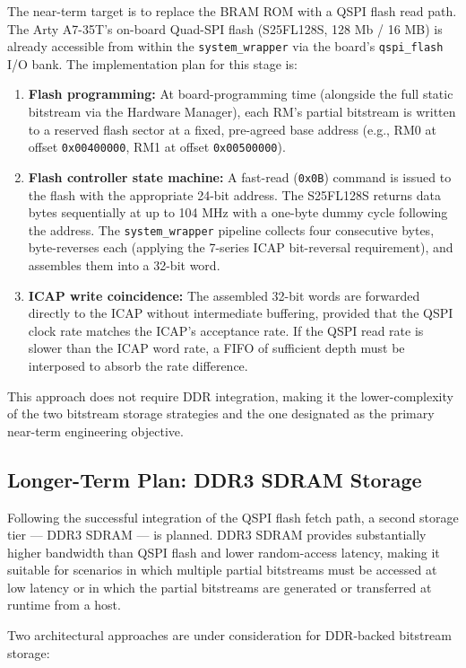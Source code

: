 The near-term target is to replace the BRAM ROM with a QSPI flash read path. The Arty A7-35T's on-board Quad-SPI flash (S25FL128S, 128 Mb / 16 MB) is already accessible from within the \texttt{system\_wrapper} via the board's \texttt{qspi\_flash} I/O bank. The implementation plan for this stage is:

\begin{enumerate}
  \item \textbf{Flash programming:} At board-programming time (alongside the full static bitstream via the Hardware Manager), each RM's partial bitstream is written to a reserved flash sector at a fixed, pre-agreed base address (e.g., RM0 at offset \texttt{0x00400000}, RM1 at offset \texttt{0x00500000}).
  \item \textbf{Flash controller state machine:} A fast-read (\texttt{0x0B}) command is issued to the flash with the appropriate 24-bit address. The S25FL128S returns data bytes sequentially at up to 104 MHz with a one-byte dummy cycle following the address. The \texttt{system\_wrapper} pipeline collects four consecutive bytes, byte-reverses each (applying the 7-series ICAP bit-reversal requirement), and assembles them into a 32-bit word.
  \item \textbf{ICAP write coincidence:} The assembled 32-bit words are forwarded directly to the ICAP without intermediate buffering, provided that the QSPI clock rate matches the ICAP's acceptance rate. If the QSPI read rate is slower than the ICAP word rate, a FIFO of sufficient depth must be interposed to absorb the rate difference.
\end{enumerate}
This approach does not require DDR integration, making it the lower-complexity of the two bitstream storage strategies and the one designated as the primary near-term engineering objective.

\subsection{Longer-Term Plan: DDR3 SDRAM Storage}

Following the successful integration of the QSPI flash fetch path, a second storage tier — DDR3 SDRAM — is planned. DDR3 SDRAM provides substantially higher bandwidth than QSPI flash and lower random-access latency, making it suitable for scenarios in which multiple partial bitstreams must be accessed at low latency or in which the partial bitstreams are generated or transferred at runtime from a host.

Two architectural approaches are under consideration for DDR-backed bitstream storage:

